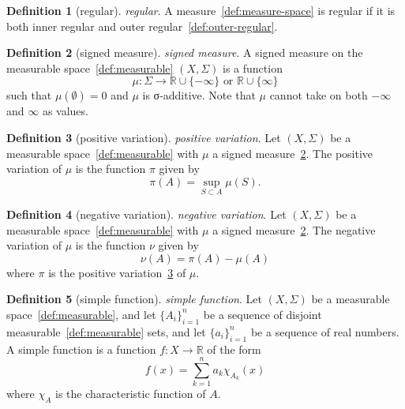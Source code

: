 \documentclass[12pt,a4paper]{article}
\theoremstyle{definition}
\newtheorem{definition}{Definition}
\begin{document}
\begin{definition}[regular]\label{def:regular}
\emph{regular}. A measure~\ref{def:measure-space} is regular if it is both inner regular and outer regular~\ref{def:outer-regular}.
\end{definition}

\begin{definition}[signed measure]\label{def:signed-measure}
\emph{signed measure}. A signed measure on the measurable space~\ref{def:measurable} $(X,\Sigma)$ is a function $$\mu: \Sigma \to \mathbb R \cup \{-\infty\} \text{ or } \mathbb R \cup \{\infty\}$$ such that $\mu(\emptyset) =0$ and $\mu$ is σ-additive. Note that $\mu$ cannot take on both $-\infty$ and $\infty$ as values.
\end{definition}

\begin{definition}[positive variation]\label{def:positive-variation}
\emph{positive variation}. Let $(X,\Sigma)$ be a measurable space~\ref{def:measurable} with $\mu$ a signed measure~\ref{def:signed-measure}. The positive variation of $\mu$ is the function $\pi$ given by $$\pi(A) = \sup_{S\subset A} \mu(S).$$
\end{definition}

\begin{definition}[negative variation]\label{def:negative-variation}
\emph{negative variation}. Let $(X,\Sigma)$ be a measurable space~\ref{def:measurable} with $\mu$ a signed measure~\ref{def:signed-measure}. The negative variation of $\mu$ is the function $\nu$ given by $$\nu(A) = \pi(A)-\mu(A)$$ where $\pi$ is the positive variation~\ref{def:positive-variation} of $\mu$.
\end{definition}

\begin{definition}[simple function]\label{def:simple-function}
\emph{simple function}. Let $(X,\Sigma)$ be a measurable space~\ref{def:measurable}, and let $\{A_i\}_{i=1}^n$ be a sequence of disjoint measurable~\ref{def:measurable} sets, and let $\{a_i\}_{i=1}^n$ be a sequence of real numbers. A simple function is a function $f:X\to \mathbb R$ of the form $$f(x) = \sum_{k=1}^n a_k\chi_{A_k}(x)$$ where $\chi_A$ is the characteristic function of $A$.
\end{definition}
\end{document}
